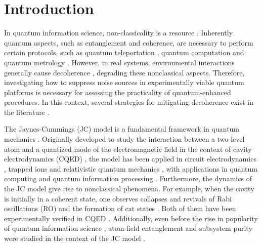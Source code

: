 \documentclass[aps,pre,superscriptaddress,twocolumn,10pt]{revtex4-2}
\begin{document}
\section{Introduction}
\label{sec:intro}

In quantum information science, non-classicality is a  resource \cite{Plenio2014,Chitambar2019}. 
Inherently quantum aspects, such as entanglement and coherence, are necessary to perform certain protocols, such as quantum teleportation \cite{Bennett1993}, quantum computation \cite{Hillery2016} and quantum metrology \cite{Berrada2012,Giorda2018}.
However, in real systems, environmental interactions generally cause decoherence \cite{Yu2002b,Dur2004,Breuer2007}, degrading these nonclassical aspects. 
Therefore, investigating how to suppress noise sources in experimentally viable quantum platforms is necessary for assessing the  practicality of quantum-enhanced procedures. 
In this context, several strategies for mitigating decoherence exist in the literature \cite{Shor1995,Cirac1996,Lidar1998,Vitali1999,Mohseni2003,Maniscalco2008,Xiao2010,Li-Yuan2010,Xiao2011,Xiao2013,Man2015,Rafiee2016,Behzadi2017,Fasihi2019,Akbari-Kourbolagh2020,Forozesh2021,Tao2026}.

The Jaynes-Cummings (JC) model is a fundamental framework in quantum mechanics \cite{jaynes1963,LARSON2021}.
Originally developed to study the interaction between a two-level atom and a quantized mode of the electromagnetic field \cite{jaynes1963} in the context of cavity electrodynamics (CQED) \cite{REMPE1987,Brune1996}, the model has been applied in circuit electrodynamics \cite{Blais2021}, trapped ions \cite{Leibfried2003} and relativistic quantum mechanics \cite{BERMUDEZ2007},
with applications in quantum computing \cite{Azuma2011b} and quantum information processing \cite{Meher2022}.
Furthermore, the dynamics of the JC model give rise to nonclassical phenomena.
For example, when the cavity is initially in a coherent state, one observes
collapses and revivals of Rabi oscillations (RO) \cite{Eberly1980,Brune1996} and the formation of cat states \cite{Guo1996,Gerry1997}. 
Both of them have been experimentally verified in CQED \cite{Brune1996,Auffeves2003}.  
Additionally, even before the rise in popularity of quantum information science \cite{LARSON2021}, 
atom-field entanglement and subsystem purity were studied in the context of the JC model
\cite{Aravind1984,Phoenix1988,Phoenix1991}.
\end{document}
